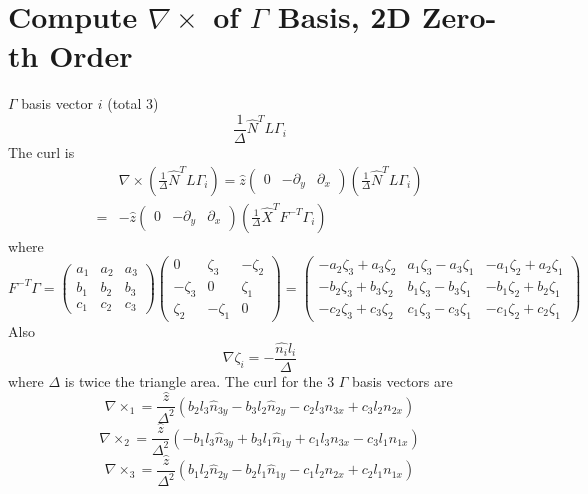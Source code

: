 \documentclass[a4paper,onecolumn]{article}
\begin{document}
\setcounter{page}{1}

\section{Compute $\nabla\times$ of $\Gamma$ Basis, 2D Zero-th Order}
$\Gamma$ basis vector $i$ (total 3)
$$
    \frac{1}{\Delta} \hat{N}^T L \Gamma_i
$$
The curl is
\begin{equation*}\begin{split}
    & \nabla \times (\frac{1}{\Delta} \hat{N}^T L \Gamma_i) =
    \hat{z} 
    \begin{pmatrix}
         0 &-\partial_y &\partial_x
     \end{pmatrix} (\frac{1}{\Delta} \hat{N}^T L \Gamma_i)\\
    = & - \hat{z} 
     \begin{pmatrix}
         0 &-\partial_y &\partial_x
     \end{pmatrix} (\frac{1}{\Delta} \hat{X}^T F^{-T} \Gamma_i)
\end{split}\end{equation*}
where
$$
    F^{-T} \Gamma =
    \begin{pmatrix}
        a_1 & a_2 & a_3\\
        b_1 & b_2 & b_3\\
        c_1 & c_2 & c_3 
    \end{pmatrix}
    \begin{pmatrix}
        0 & \zeta_3 &-\zeta_2\\
        -\zeta_3 & 0 & \zeta_1\\
        \zeta_2 & -\zeta_1 & 0
    \end{pmatrix}
    = \begin{pmatrix}
        -a_2 \zeta_3 + a_3 \zeta_2 & a_1 \zeta_3 - a_3 \zeta_1 & - a_1 \zeta_2 + a_2 \zeta_1\\
        - b_2 \zeta_3 + b_3 \zeta_2 & b_1 \zeta_3 - b_3 \zeta_1 & - b_1 \zeta_2 + b_2 \zeta_1 \\
        -c_2 \zeta_3 + c_3 \zeta_2 & c_1 \zeta_3 - c_3 \zeta_1 & - c_1 \zeta_2 + c_2\zeta_1
    \end{pmatrix}
$$
Also
$$
    \nabla \zeta_i = - \frac{\hat{n_i}l_i}{\Delta}
$$
where $\Delta$ is twice the triangle area.
The curl for the 3 $\Gamma$ basis vectors are
$$
    \nabla\times_1 = \frac{\hat{z}}{\Delta^2} (b_2 l_3 \hat{n}_{3y} - b_3 l_2 \hat{n}_{2y}
    -c_2 l_3 n_{3x} + c_3 l_2 n_{2x})
$$
$$
    \nabla\times_2 = \frac{\hat{z}}{\Delta^2} (-b_1 l_3 \hat{n}_{3y} + b_3 l_1 \hat{n}_{1y}
    +c_1 l_3 n_{3x} - c_3 l_1 n_{1x})
$$
$$
    \nabla\times_3 = \frac{\hat{z}}{\Delta^2} (b_1 l_2 \hat{n}_{2y} - b_2 l_1 \hat{n}_{1y}
    -c_1 l_2 n_{2x} + c_2 l_1 n_{1x})
$$
\end{document}
